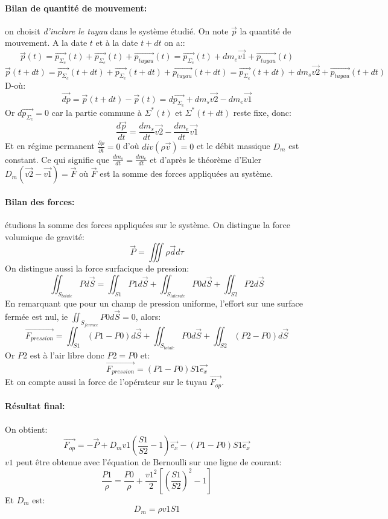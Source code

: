 \documentclass[10pt,a4paper]{article}
\begin{document}
\paragraph{Bilan de quantité de mouvement:} on choisit \textit{d'inclure le tuyau }dans le système étudié. On note $\vec{p}$ la quantité de mouvement. A la date $t$ et à la date $t+dt$ on a::
\[\vec{p}(t) = \vec{p_{\Sigma_{c}}}(t) + \vec{p_{\Sigma_{e}}}(t) +  \vec{p_{tuyau}}(t) = \vec{p_{\Sigma_{c}}}(t) + dm_{e}\vec{v1} +  \vec{p_{tuyau}}(t)\]
\[\vec{p}(t+dt) = \vec{p_{\Sigma_{c}}}(t+dt) + \vec{p_{\Sigma_{e}}}(t+dt) +  \vec{p_{tuyau}}(t+dt) = \vec{p_{\Sigma_{c}}}(t+dt) + dm_{s}\vec{v2} +  \vec{p_{tuyau}}(t+dt)\]
D-où:
\[ \vec{dp} = \vec{p}(t+dt) - \vec{p}(t) = d\vec{p_{\Sigma_{c}}} + dm_{s}\vec{v2} - dm_{e}\vec{v1} \]
Or $d\vec{p_{\Sigma_{c}}} = 0$ car la partie commune à $\Sigma^{*}(t)$ et $\Sigma^{*}(t+dt)$ reste fixe, donc:
\[ \frac{d\vec{p}}{dt} = \frac{dm_{s}}{dt}\vec{v2} - \frac{dm_{e}}{dt}\vec{v1}\]
Et en régime permanent $\frac{\partial \rho}{\partial t} = 0$ d'où $div(\rho\vec{v}) = 0$ et le débit massique $D_{m}$ est constant. Ce qui signifie que $\frac{dm_{s}}{dt} = \frac{dm_{e}}{dt}$ et d'après le théorème d'Euler $D_{m}(\vec{v2}-\vec{v1}) = \vec{F}$ où $\vec{F}$ est la somme des forces appliquées au système.

\paragraph{Bilan des forces:} étudions la somme des forces appliquées sur le système. On distingue la force volumique de gravité:
\[ \vec{P} = \iiint \rho\vec{d} d\tau\]
On distingue aussi la force surfacique de pression:
\[\iint_{S_{totale}}Pd\vec{S} = \iint_{S1}P1d\vec{S} + \iint_{S_{laterale}}P0d\vec{S} + \iint_{S2}P2d\vec{S}\]
En remarquant que pour un champ de pression uniforme, l'effort sur une surface fermée est nul, ie $\iint_{S_{fermee}}P0d\vec{S} = 0$, alors:
\[\vec{F_{pression}} = \iint_{S1}(P1-P0)d\vec{S} + \iint_{S_{totale}}P0d\vec{S} + \iint_{S2}(P2-P0)d\vec{S}\]
Or $P2$ est à l'air libre donc $P2=P0$ et:
\[\vec{F_{pression}} = (P1-P0)S1 \vec{e_{x}}\]
Et on compte aussi la force de l'opérateur sur le tuyau $\vec{F_{op}}$.

\paragraph{Résultat final:}
On obtient:
\[\vec{F_{op}} = -\vec{P} + D_{m}v1(\frac{S1}{S2} - 1)\vec{e_{x}} - (P1-P0)S1\vec{e_{x}}\]
$v1$ peut être obtenue avec l'équation de Bernoulli sur une ligne de courant:
\[\frac{P1}{\rho} = \frac{P0}{\rho} + \frac{v1^{2}}{2}[(\frac{S1}{S2})^{2} - 1]\]
Et $D_{m}$ est:
\[ D_{m} = \rho v1 S1 \]
\end{document}
